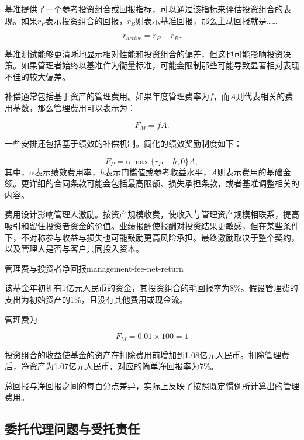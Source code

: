 基准提供了一个参考投资组合或回报指标，可以通过该指标来评估投资组合的表现。如果$r_P$表示投资组合的回报，$r_B$则表示基准回报，那么主动回报就是……

\begin{equation}
r_{active}=r_P-r_B.
\label{eq:ch14-active-return}
\end{equation}

基准测试能够更清晰地显示相对性能和投资组合的偏差，但这也可能影响投资决策。如果管理者始终以基准作为衡量标准，可能会限制那些可能导致显著相对表现不佳的较大偏差。

补偿通常包括基于资产的管理费用。如果年度管理费率为$f$，而$A$则代表相关的费用基数，那么管理费用可以表示为：

\begin{equation}
F_M=fA.
\label{eq:ch14-management-fee}
\end{equation}

一些安排还包括基于绩效的补偿机制。简化的绩效奖励制度如下：

\begin{equation}
F_P=\alpha\max\{r_P-h,0\}A,
\label{eq:ch14-performance-fee}
\end{equation}
其中，$\alpha$表示绩效费用率，$h$表示门槛值或参考收益水平，$A$则表示费用的基础金额。更详细的合同条款可能会包括最高限额、损失承担条款，或者基准调整相关的内容。

费用设计影响管理人激励。按资产规模收费，使收入与管理资产规模相联系，提高吸引和留住投资者资金的价值。业绩报酬使报酬对投资结果更敏感，但在某些条件下，不对称参与收益与损失也可能鼓励更高风险承担。最终激励取决于整个契约，以及管理人是否与客户共同投入资本。

\begin{example}{管理费与投资者净回报}{management-fee-net-return}

该基金年初拥有1亿元人民币的资金，其投资组合的毛回报率为8\%。假设管理费的支出为初始资产的1\%，且没有其他费用或现金流。

管理费为

\[
F_M=0.01\times100=1
\]

投资组合的收益使基金的资产在扣除费用前增加到1.08亿元人民币。扣除管理费后，净资产为1.07亿元人民币，对应的简单净回报率为7\%。

总回报与净回报之间的每百分点差异，实际上反映了按照既定惯例所计算出的管理费用。

\end{example}

\subsection[委托代理问题与受托责任]{委托代理问题与受托责任}

